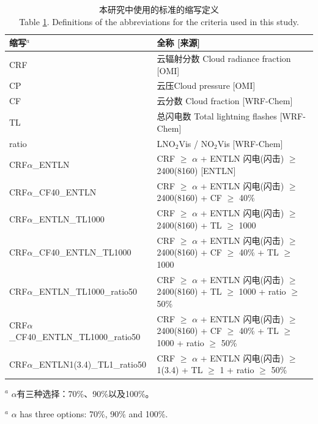 \begin{table}[htbp]
\caption{本研究中使用的标准的缩写定义\\Table \ref{table:Abbreviations}. Definitions of the abbreviations for the criteria used in this study.}
\scriptsize
\begin{tabular}{ll}
\hline
缩写$^a$ & 全称 [来源] \\
\hline
CRF                             & 云辐射分数 Cloud radiance fraction [OMI] \\
CP                              & 云压Cloud pressure [OMI] \\
CF                              & 云分数 Cloud fraction [WRF-Chem] \\
TL                              & 总闪电数 Total lightning flashes [WRF-Chem] \\
ratio                           & LNO$_2$Vis / NO$_2$Vis [WRF-Chem] \\
CRF$\alpha$\_ENTLN                   & CRF $\geq$ $\alpha$ + ENTLN 闪电(闪击) $\geq$ 2400(8160) [ENTLN]\\
CRF$\alpha$\_CF40\_ENTLN              & CRF $\geq$ $\alpha$ + ENTLN 闪电(闪击) $\geq$ 2400(8160) + CF $\geq$ 40\% \\
CRF$\alpha$\_ENTLN\_TL1000            & CRF $\geq$ $\alpha$ + ENTLN 闪电(闪击) $\geq$ 2400(8160) + TL $\geq$ 1000 \\
CRF$\alpha$\_CF40\_ENTLN\_TL1000      & CRF $\geq$ $\alpha$ + ENTLN 闪电(闪击) $\geq$ 2400(8160) + CF $\geq$ 40\% + TL $\geq$ 1000 \\
CRF$\alpha$\_ENTLN\_TL1000\_ratio50   & CRF $\geq$ $\alpha$ + ENTLN 闪电(闪击) $\geq$ 2400(8160) + TL $\geq$ 1000 + ratio $\geq$ 50\% \\
CRF$\alpha$\_CF40\_ENTLN\_TL1000\_ratio50 & CRF $\geq$ $\alpha$ + ENTLN 闪电(闪击) $\geq$ 2400(8160) + CF $\geq$ 40\% + TL $\geq$ 1000 + ratio $\geq$ 50\% \\
CRF$\alpha$\_ENTLN1(3.4)\_TL1\_ratio50    & CRF $\geq$ $\alpha$ + ENTLN 闪电(闪击) $\geq$ 1(3.4) + TL $\geq$ 1 + ratio $\geq$ 50\% \\
\hline
\end{tabular}
\begin{tablenotes}
\footnotesize
\item $^a$ $\alpha$有三种选择：70\%、90\%以及100\%。
\item $^a$ $\alpha$ has three options: 70\%, 90\% and 100\%.
\end{tablenotes}
\label{table:Abbreviations}
\end{table}


